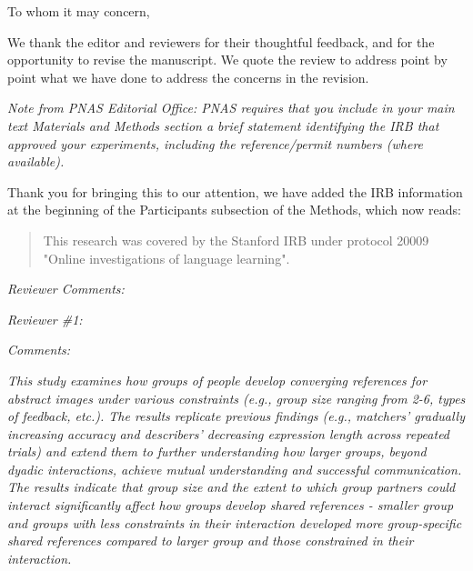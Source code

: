 \documentclass{stanfordletter}
\newcommand{\theysaid}[1]{\begin{leftbar} \noindent 
		\textsl{ #1}\end{leftbar}}
\newcommand{\revised}[1]{\begin{quote}	#1 \end{quote}}
\begin{document}
	\signature{Veronica Boyce \\ Robert D. Hawkins \\ Noah D. Goodman \\ Michael C. Frank}
	
	
	\begin{letter}{}
		
		
          \opening{To whom it may concern, } 

         
          We thank the editor and reviewers for their thoughtful feedback, and for the opportunity to revise the manuscript. We quote the review to address point by point what we have done to address the concerns in the revision.  
          
          \theysaid{Note from PNAS Editorial Office: PNAS requires that you include in your main text Materials and Methods section a brief statement identifying the IRB that approved your experiments, including the reference/permit numbers (where available).}
          Thank you for bringing this to our attention, we have added the IRB information at the beginning of the Participants subsection of the Methods, which now reads: 
\revised{This research was covered by the Stanford IRB under protocol 20009 "Online investigations of language learning". } 
          
          
          \theysaid{Reviewer Comments:}
         \theysaid{Reviewer \#1:}
          
          \theysaid{Comments:}
          \theysaid{This study examines how groups of people develop converging references for abstract images under various constraints (e.g., group size ranging from 2-6, types of feedback, etc.). The results replicate previous findings (e.g., matchers' gradually increasing accuracy and describers' decreasing expression length across repeated trials) and extend them to further understanding how larger groups, beyond dyadic interactions, achieve mutual understanding and successful communication. The results indicate that group size and the extent to which group partners could interact significantly affect how groups develop shared references - smaller group and groups with less constraints in their interaction developed more group-specific shared references compared to larger group and those constrained in their interaction.}
          

\end{letter}
\end{document}
